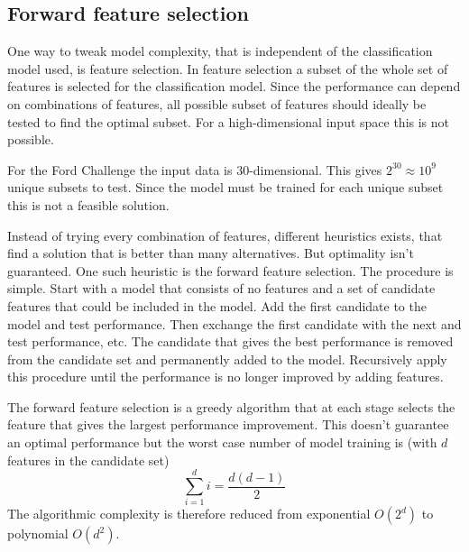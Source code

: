 \subsection{Forward feature selection}
One way to tweak model complexity, that is independent of the classification model used, is feature selection. In feature selection a subset of the whole set of features is selected for the classification model. Since the performance can depend on combinations of features, all possible subset of features should ideally be tested to find the optimal subset. For a high-dimensional input space this is not possible.
\begin{Exa}
    For the Ford Challenge the input data is 30-dimensional. This gives $2^{30}\approx10^9$ unique subsets to test. Since the model must be trained for each unique subset this is not a feasible solution.
\end{Exa}
Instead of trying every combination of features, different heuristics exists, that find a solution that is better than many alternatives. But optimality isn't guaranteed. One such heuristic is the forward feature selection. The procedure is simple. Start with a model that consists of no features and a set of candidate features that could be included in the model. Add the first candidate to the model and test performance. Then exchange the first candidate with the next and test performance, etc. The candidate that gives the best performance is removed from the candidate set and permanently added to the model. Recursively apply this procedure until the performance is no longer improved by adding features. \par
The forward feature selection is a greedy algorithm that at each stage selects the feature that gives the largest performance improvement. This doesn't guarantee an optimal performance but the worst case number of model training is (with $d$ features in the candidate set)
\[
    \sum_{i=1}^d i = \frac{d(d-1)}{2}
\]
The algorithmic complexity is therefore reduced from exponential $O(2^d)$ to polynomial $O(d^2)$.

